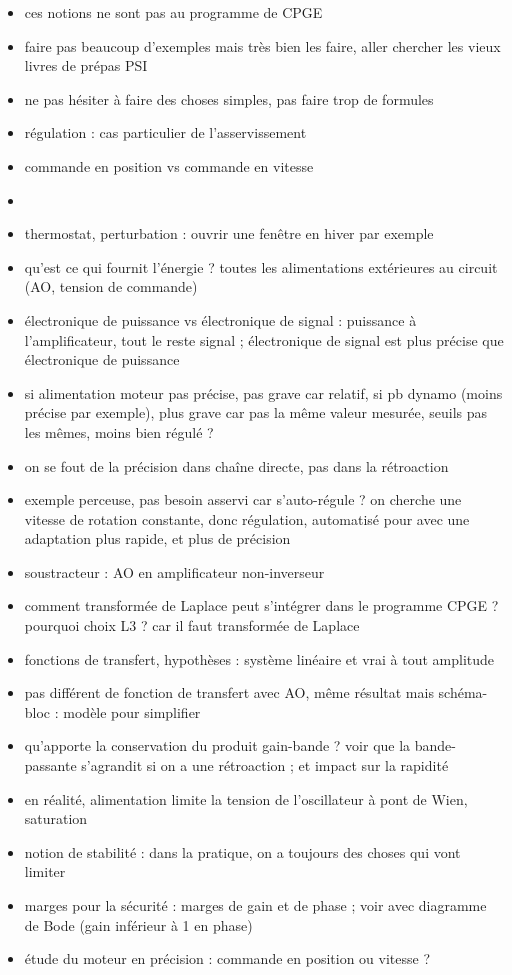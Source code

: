\begin{remarques} \begin{itemize} 
\item ces notions ne sont pas au programme de CPGE
\item faire pas beaucoup d'exemples mais très bien les faire, aller chercher les vieux livres de prépas PSI
\item ne pas hésiter à faire des choses simples, pas faire trop de formules
\item régulation : cas particulier de l'asservissement
\item commande en position vs commande en vitesse
\item 
\item thermostat, perturbation : ouvrir une fenêtre en hiver par exemple
\item qu'est ce qui fournit l'énergie ? toutes les alimentations extérieures au circuit (AO, tension de commande)
\item électronique de puissance vs électronique de signal : puissance à l'amplificateur, tout le reste signal ; électronique de signal est plus précise que électronique de puissance
\item si alimentation moteur pas précise, pas grave car relatif, si pb dynamo (moins précise par exemple), plus grave car pas la même valeur mesurée, seuils pas les mêmes, moins bien régulé ?
\item on se fout de la précision dans chaîne directe, pas dans la rétroaction
\item exemple perceuse, pas besoin asservi car s'auto-régule ? on cherche une vitesse de rotation constante, donc régulation, automatisé pour avec une adaptation plus rapide, et plus de précision
\item soustracteur : AO en amplificateur non-inverseur
\item comment transformée de Laplace peut s'intégrer dans le programme CPGE ? pourquoi choix L3 ? car il faut transformée de Laplace
\item fonctions de transfert, hypothèses : système linéaire et vrai à tout amplitude
\item pas différent de fonction de transfert avec AO, même résultat mais schéma-bloc : modèle pour simplifier 
\item qu'apporte la conservation du produit gain-bande ? voir que la bande-passante s'agrandit si on a une rétroaction ; et impact sur la rapidité
\item en réalité, alimentation limite la tension de l'oscillateur à pont de Wien, saturation
\item notion de stabilité : dans la pratique, on a toujours des choses qui vont limiter
\item marges pour la sécurité : marges de gain et de phase ; voir avec diagramme de Bode (gain inférieur à 1 en phase)
\item étude du moteur en précision : commande en position ou vitesse ? 
\end{itemize} \end{remarques}